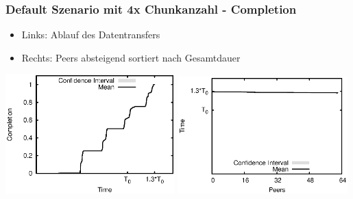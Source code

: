 \begin{frame}
  \frametitle{Default Szenario mit 4x Chunkanzahl - Completion}
  \begin{itemize}  
    \item Links: Ablauf des Datentransfers
    \item Rechts: Peers absteigend sortiert nach Gesamtdauer
  \end{itemize}

  \begin{center}
    \includegraphics[width=0.49\textwidth]{fig/plots/scenario_15_chunk_count_fac_4/plots/GeneratedMeanChunkCompletion.csv.eps}
    \hfill
    \includegraphics[width=0.49\textwidth]{fig/plots/scenario_15_chunk_count_fac_4/plots/GeneratedMeanSortedChunkCompletion.csv.eps}
  \end{center}
\end{frame}


